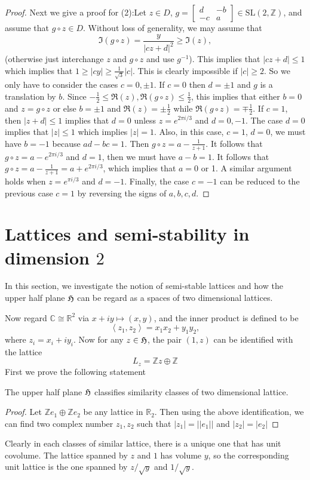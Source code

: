 \begin{proof}
  Next we give a proof for (2):Let $z \in D$, $g = \begin{bmatrix} d & -b \\ -c & a \end{bmatrix} \in \mathrm{SL}(2, \mathbb{Z})$, and assume that $g \circ z \in D$. Without loss of generality, we may assume that
  \[
    \Im(g \circ z) = \frac{y}{|cz + d|^2} \geq \Im(z),
  \]
  (otherwise just interchange $z$ and $g \circ z$ and use $g^{-1}$). This implies that $|cz + d| \leq 1$ which implies that $1 \geq |cy| \geq \frac{1}{\sqrt{3}}|c|$. This is clearly impossible if $|c| \geq 2$. So we only have to consider the cases $c = 0, \pm 1$. If $c = 0$ then $d = \pm 1$ and $g$ is a translation by $b$. Since $-\frac{1}{2} \leq \Re(z), \Re(g \circ z) \leq \frac{1}{2}$, this implies that either $b = 0$ and $z = g \circ z$ or else $b = \pm 1$ and $\Re(z) = \pm \frac{1}{2}$ while $\Re(g \circ z) = \mp \frac{1}{2}$. If $c = 1$, then $|z + d| \leq 1$ implies that $d = 0$ unless $z = e^{2\pi i / 3}$ and $d = 0, -1$. The case $d = 0$ implies that $|z| \leq 1$ which implies $|z| = 1$. Also, in this case, $c = 1$, $d = 0$, we must have $b = -1$ because $ad - bc = 1$. Then $g \circ z = a - \frac{1}{z + 1}$. It follows that $g \circ z = a - e^{2\pi i / 3}$ and $d = 1$, then we must have $a - b = 1$. It follows that $g \circ z = a - \frac{1}{z + 1} = a + e^{2\pi i / 3}$, which implies that $a = 0$ or 1. A similar argument holds when $z = e^{\pi i / 3}$ and $d = -1$. Finally, the case $c = -1$ can be reduced to the previous case $c = 1$ by reversing the signs of $a, b, c, d$.
\end{proof}
\section{Lattices and semi-stability in dimension $2$}
In this section, we investigate the notion of semi-stable lattices and how the
upper half plane $\operatorname{\mathfrak{H}}$ can be regard as a spaces of two dimensional lattices.

Now regard $\mathbb{C} \cong \mathbb{R}^2$ via $x+iy \mapsto (x,y)$, and the inner product is defined to be
\[\left\langle z_1, z_2 \right\rangle = x_1x_2 + y_1y_2,\]
where $z_i= x_i+iy_i$. Now for any $z \in \operatorname{\mathfrak{H}}$, the pair $(1,z)$ can be identified with the lattice
\[L_z = \mathbb{Z}z \oplus \mathbb{Z}\]
First we prove the following statement
\begin{prop}
  The upper half plane $\operatorname{\mathfrak{H}}$ classifies similarity classes of two dimensional lattice.
\end{prop}
\begin{proof}
  Let $\mathbb{Z}e_1\oplus \mathbb{Z}e_2$ be any lattice in $\mathbb{R}_2$. Then using the
  above identification, we can find two complex number $z_1,z_2$ such that $|z_1| = ||e_1||$ and
  $|z_2| = \lvert e_2 \rvert$
\end{proof}
Clearly in each classes of similar lattice, there is a unique one that has unit covolume.
The lattice spanned by $z$ and $1$ has volume $y$, so the corresponding unit lattice is the one spanned
by $z/\sqrt{y}$ and $1/\sqrt{y}$.

